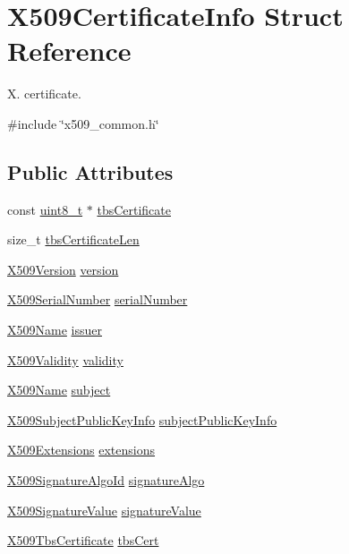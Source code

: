 \hypertarget{structX509CertificateInfo}{}\section{X509\+Certificate\+Info Struct Reference}
\label{structX509CertificateInfo}


X. certificate.  




{\ttfamily \#include \char`\"{}x509\+\_\+common.\+h\char`\"{}}

\subsection*{Public Attributes}
\begin{DoxyCompactItemize}
\item 
const \hyperlink{stdint_8h_aba7bc1797add20fe3efdf37ced1182c5}{uint8\+\_\+t} $\ast$ \hyperlink{structX509CertificateInfo_a6f0f56fdd661c01753b5408a831f3dcd}{tbs\+Certificate}
\item 
size\+\_\+t \hyperlink{structX509CertificateInfo_a4db5f8e3cc589a8445eebf86863e205a}{tbs\+Certificate\+Len}
\item 
\hyperlink{certificate_2x509__common_8h_a42c631650a1a4fbe9d70d54d99dcac26}{X509\+Version} \hyperlink{structX509CertificateInfo_a15902fd60ae1f744a24fed017535891f}{version}
\item 
\hyperlink{structX509SerialNumber}{X509\+Serial\+Number} \hyperlink{structX509CertificateInfo_a7e16de43b3c58b80c62fbd633d4f1a42}{serial\+Number}
\item 
\hyperlink{structX509Name}{X509\+Name} \hyperlink{structX509CertificateInfo_a21948b3fc93a9d531e6855243c5681c7}{issuer}
\item 
\hyperlink{structX509Validity}{X509\+Validity} \hyperlink{structX509CertificateInfo_aca3c2dbc54d2b8a711ed3b9c3c595fa8}{validity}
\item 
\hyperlink{structX509Name}{X509\+Name} \hyperlink{structX509CertificateInfo_adaf5e2c713f42a2ca307b2d4eed55a0e}{subject}
\item 
\hyperlink{structX509SubjectPublicKeyInfo}{X509\+Subject\+Public\+Key\+Info} \hyperlink{structX509CertificateInfo_a1e15bfaddec61608bad974fa7385d225}{subject\+Public\+Key\+Info}
\item 
\hyperlink{structX509Extensions}{X509\+Extensions} \hyperlink{structX509CertificateInfo_a6fbc847cf3a3459834fae3c4ece76297}{extensions}
\item 
\hyperlink{structX509SignatureAlgoId}{X509\+Signature\+Algo\+Id} \hyperlink{structX509CertificateInfo_a557f43736fe7dab190eac1cd31559281}{signature\+Algo}
\item 
\hyperlink{structX509SignatureValue}{X509\+Signature\+Value} \hyperlink{structX509CertificateInfo_a14aae7b8131fdc0d1cae4ccc6be1f02d}{signature\+Value}
\item 
\hyperlink{structX509TbsCertificate}{X509\+Tbs\+Certificate} \hyperlink{structX509CertificateInfo_acfa4445df39031f204f8936a2eec189e}{tbs\+Cert}
\end{DoxyCompactItemize}


